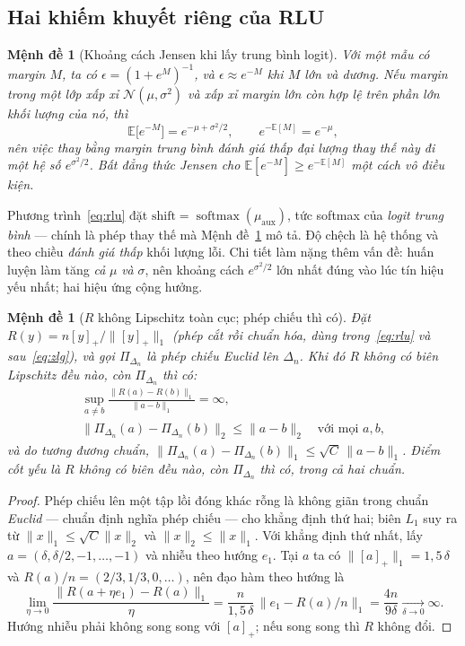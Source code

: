 \documentclass[11pt]{article}
\newtheorem{menhde}[dinhly]{Mệnh đề}
\theoremstyle{remark}
\newcommand{\E}{\mathbb{E}}
\newcommand{\pos}[1]{\left[#1\right]_+}
\newcommand{\simplex}{\Delta_n}
\DeclareMathOperator{\softmaxop}{softmax}
\begin{document}
\subsection{Hai khiếm khuyết riêng của RLU}

\begin{menhde}[Khoảng cách Jensen khi lấy trung bình logit]
\label{md:jensen}
Với một mẫu có margin $M$, ta có $\epsilon = (1+e^M)^{-1}$, và
$\epsilon \approx e^{-M}$ khi $M$ lớn và dương. Nếu margin trong một lớp xấp
xỉ $\mathcal N(\mu,\sigma^2)$ và xấp xỉ margin lớn còn hợp lệ trên phần lớn
khối lượng của nó, thì
\[
 \E\bigl[e^{-M}\bigr] = e^{-\mu + \sigma^2/2},
 \qquad e^{-\E[M]} = e^{-\mu},
\]
nên việc thay bằng margin trung bình \emph{đánh giá thấp} đại lượng thay thế
này đi một hệ số $e^{\sigma^2/2}$. Bất đẳng thức Jensen cho
$\E[e^{-M}] \ge e^{-\E[M]}$ một cách vô điều kiện.
\end{menhde}

Phương trình~\eqref{eq:rlu} đặt
$\mathrm{shift} = \softmaxop(\mu_{\mathrm{aux}})$, tức softmax của
\emph{logit trung bình} --- chính là phép thay thế mà
Mệnh đề~\ref{md:jensen} mô tả. Độ chệch là hệ thống và theo chiều
\emph{đánh giá thấp} khối lượng lỗi. Chi tiết làm nặng thêm vấn đề: huấn
luyện làm tăng \emph{cả} $\mu$ \emph{và} $\sigma$, nên khoảng cách
$e^{\sigma^2/2}$ lớn nhất đúng vào lúc tín hiệu yếu nhất; hai hiệu ứng cộng
hưởng.

\begin{menhde}[$R$ không Lipschitz toàn cục; phép chiếu thì có]
\label{md:lipschitz}
Đặt $R(y) = n\pos{y}/\|\pos{y}\|_1$ (phép cắt rồi chuẩn hóa, dùng
trong~\eqref{eq:rlu} và sau~\eqref{eq:zlg}), và gọi $\Pi_{\simplex}$ là phép
chiếu Euclid lên $\simplex$. Khi đó $R$ không có biên Lip\-schitz đều nào,
còn $\Pi_{\simplex}$ thì có:
\begin{gather*}
 \sup_{a \ne b} \frac{\|R(a)-R(b)\|_1}{\|a-b\|_1} = \infty, \\[0.2em]
 \|\Pi_{\simplex}(a) - \Pi_{\simplex}(b)\|_2 \le \|a-b\|_2
 \quad \text{với mọi } a,b,
\end{gather*}
và do tương đương chuẩn, $\|\Pi_{\simplex}(a)-\Pi_{\simplex}(b)\|_1 \le
\sqrt{C}\,\|a-b\|_1$. Điểm cốt yếu là $R$ \emph{không} có biên đều nào, còn
$\Pi_{\simplex}$ thì có, trong cả hai chuẩn.
\end{menhde}

\begin{proof}
Phép chiếu lên một tập lồi đóng khác rỗng là không giãn trong chuẩn
\emph{Euclid} --- chuẩn định nghĩa phép chiếu --- cho khẳng định thứ hai;
biên $L_1$ suy ra từ $\|x\|_1 \le \sqrt C\|x\|_2$ và $\|x\|_2 \le \|x\|_1$.
Với khẳng định thứ nhất, lấy
$a = (\delta, \delta/2, -1, \ldots, -1)$ và nhiễu theo hướng $e_1$. Tại $a$ ta
có $\|\pos{a}\|_1 = 1{,}5\,\delta$ và $R(a)/n = (2/3, 1/3, 0, \ldots)$, nên
đạo hàm theo hướng là
\[
 \lim_{\eta\to0}\frac{\|R(a+\eta e_1)-R(a)\|_1}{\eta}
 = \frac{n}{1{,}5\,\delta}\,\bigl\|e_1 - R(a)/n\bigr\|_1
 = \frac{4n}{9\delta} \xrightarrow[\delta\to0]{} \infty .
\]
Hướng nhiễu phải không song song với $\pos{a}$; nếu song song thì $R$ không
đổi.
\end{proof}
\end{document}
